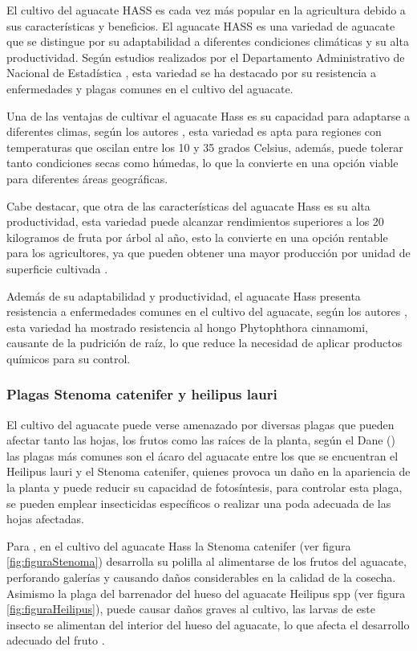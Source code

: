 El cultivo del aguacate HASS es cada vez más popular en la agricultura debido a sus características y beneficios. El aguacate HASS es una variedad de aguacate que se distingue por su adaptabilidad a diferentes condiciones climáticas y su alta productividad. Según estudios realizados por el Departamento Administrativo de Nacional de Estadística \citep{dane2016cultivo}, esta variedad se ha destacado por su resistencia a enfermedades y plagas comunes en el cultivo del aguacate.

Una de las ventajas de cultivar el aguacate Hass es su capacidad para adaptarse a diferentes climas, según los autores \citet{reyes2022}, esta variedad es apta para regiones con temperaturas que oscilan entre los 10 y 35 grados Celsius, además, puede tolerar tanto condiciones secas como húmedas, lo que la convierte en una opción viable para diferentes áreas geográficas.

Cabe destacar, que  otra de las características  del aguacate Hass es su alta productividad, esta variedad puede alcanzar rendimientos superiores a los 20 kilogramos de fruta por árbol al año, esto la convierte en una opción rentable para los agricultores, ya que pueden obtener una mayor producción por unidad de superficie cultivada \citep{reyes2022}.

Además de su adaptabilidad y productividad, el aguacate Hass presenta resistencia a enfermedades comunes en el cultivo del aguacate, según los autores \citet{agapito2022}, esta variedad ha mostrado resistencia al hongo Phytophthora cinnamomi, causante de la pudrición de raíz, lo que reduce la necesidad de aplicar productos químicos para su control.

\subsubsection{Plagas Stenoma catenifer y heilipus lauri}

El cultivo del aguacate puede verse amenazado por diversas plagas que pueden afectar tanto las hojas, los frutos como las raíces de la planta, según  el Dane  (\citeyear{dane2016cultivo}) las plagas más comunes son el ácaro del aguacate entre los que se encuentran el Heilipus lauri y el Stenoma catenifer, quienes provoca un daño en la apariencia de la planta y puede reducir su capacidad de fotosíntesis, para controlar esta plaga, se pueden emplear insecticidas específicos o realizar una poda adecuada de las hojas afectadas.

Para \citet{carabali2022}, en el cultivo del aguacate Hass la Stenoma catenifer (ver figura \ref{fig:figuraStenoma}) desarrolla su polilla al alimentarse de los frutos del aguacate, perforando galerías y causando daños considerables en la calidad de la cosecha. Asimismo la plaga del barrenador del hueso del aguacate Heilipus spp (ver figura \ref{fig:figuraHeilipus}), puede causar daños graves al cultivo, las  larvas de este insecto se alimentan del interior del hueso del aguacate, lo que afecta el desarrollo adecuado del fruto \citep{carabali2022}.


